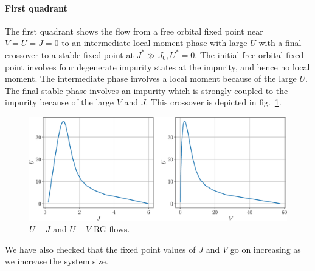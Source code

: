 \documentclass[12pt,twoside]{report}
\numberwithin{equation}{section}
\begin{document}
\paragraph*{First quadrant}
The first quadrant shows the flow from a free orbital fixed point near \(V=U=J=0\) to an intermediate local moment phase with large \(U\) with a final crossover to a stable fixed point at \(J^* \gg J_0, U^*=0\). The initial free orbital fixed point involves four degenerate impurity states at the impurity, and hence no local moment. The intermediate phase involves a local moment because of the large \(U\). The final stable phase involves an impurity which is strongly-coupled to the impurity because of the large \(V\) and \(J\). This crossover is depicted in fig.~\ref{crossover}.


\begin{figure}[htpb]
	\centering
	\includegraphics[width=\textwidth]{../figures/crossovers.pdf}
	\caption{\(U-J\) and \(U-V\) RG flows.}
	\label{crossover}
\end{figure}

We have also checked that the fixed point values of \(J\) and \(V\) go on increasing as we increase the system size.
\end{document}
